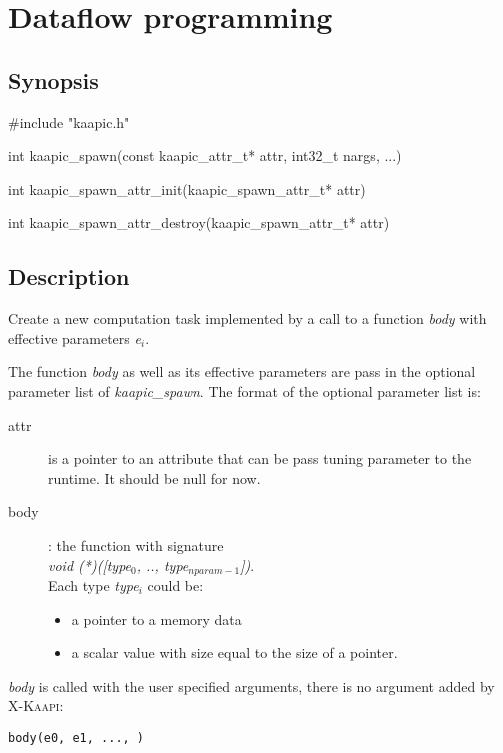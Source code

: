 \documentclass[a4paper, 11pt]{article}
\makeatletter
\newenvironment{apisection}[2][noshortnameprovided]{%
  \newpage
  \section{#2}
  \label{api@#1}
  \newcommand{\api@newpart}[4][noshortpartnameprovided]{%
    \newenvironment{##1}{%
      \subsection{##2}%
      \label{api@#1@##1}%
      ##3%
    }{##4}%
  }%
  \api@newpart[synopsis]{Synopsis}{}{}%
  \api@newpart[desc]{Description}{}{}%
  \api@newpart[params]{Parameters}{%
    \let\api@indesc\@empty
    \newcommand{\param}[1]{%
      \def\api@indesc{yes}%
      \begin{description}%
        \renewcommand{\param}[1]{\item[########1]}%
      \item[####1]
      }%
      \newenvironment{parameters}{%
        \begin{description}%
          \renewcommand{\param}[1]{\item[########1]}%
        }{%
        \end{description}%
      }
    }{%
      \ifx\api@indesc\@empty\relax\else%
    \end{description}%
    \fi%
  }%
  \api@newpart[ret]{Return value}{%
    \newcommand{\otherret}{\par\medskip\noindent}%
  }{}%
  \api@newpart[example]{Example}{}{}%
}{}
\newcommand{\fn}[1]{\textit{#1}}%
\newcommand{\kaapi}{\textsc{X-Kaapi}\xspace}
\makeatother
\begin{document}
\begin{apisection}[dataflow]{Dataflow programming}
  \begin{synopsis}
    \begin{code}
#include "kaapic.h"

int kaapic_spawn(const kaapic_attr_t* attr, int32_t nargs, ...)

int kaapic_spawn_attr_init(kaapic_spawn_attr_t* attr)

int kaapic_spawn_attr_destroy(kaapic_spawn_attr_t* attr)

    \end{code}
  \end{synopsis}
  \begin{desc}
    Create a new computation task implemented by a call to a function
    \fn{body} with effective parameters \textit{e$_i$}.

    The function \fn{body} as well as its effective parameters are pass in the optional parameter list of \fn{kaapic\_spawn}.
    The format of the optional parameter list is:
    \begin{description}
    \item[attr] is a pointer to an attribute that can be
    pass tuning parameter to the runtime. It should be null for now.

    \item [body]: the function with signature\\
      \hspace*{5ex}\textit{void (*)([type$_0$, .., type$_{nparam-1}$])}.\\
      Each type \textit{type$_i$} could be:
      \begin{itemize}
      \item a pointer to a memory data
      \item a scalar value with size equal to the size of a pointer.
      \end{itemize}
    \end{description}
    
    \fn{body} is called with the user specified arguments, there is no argument added by \kaapi:\\
    \begin{small}
      \lstset{language=C}
      \begin{lstlisting}[frame=tb]
        body(e0, e1, ..., )
      \end{lstlisting}
    \end{small}
  \end{desc}


\end{apisection}
\end{document}
